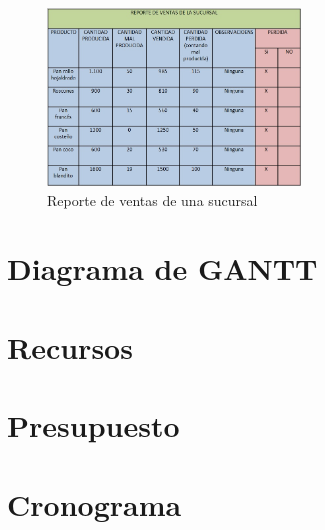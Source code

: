 \\%
\\%
\\%
\\%
\begin{figure}[htbp]
	\centering
		\includegraphics[width=0.60\textwidth]{images/REPORTEDEVENTASDELASUCURSAL.jpg}
	\caption{Reporte de ventas de una sucursal}
	\label{fig:Reporte de ventas de una sucursal}
\end{figure}%
\newpage%
\section{Diagrama de GANTT}
%
\mbox{}
\newpage%
%
\mbox{}
\newpage%
%
\section{Recursos}
%
\mbox{}
\newpage%
\mbox{}
\newpage%
\mbox{}
\newpage%
\mbox{}
\newpage%
\section{Presupuesto}
%
\mbox{}
\newpage%
%
\mbox{}
\newpage%
%
\section{Cronograma}
%
\mbox{}
\newpage%
\mbox{}
\newpage%
\mbox{}
\newpage%
\mbox{}
\newpage%